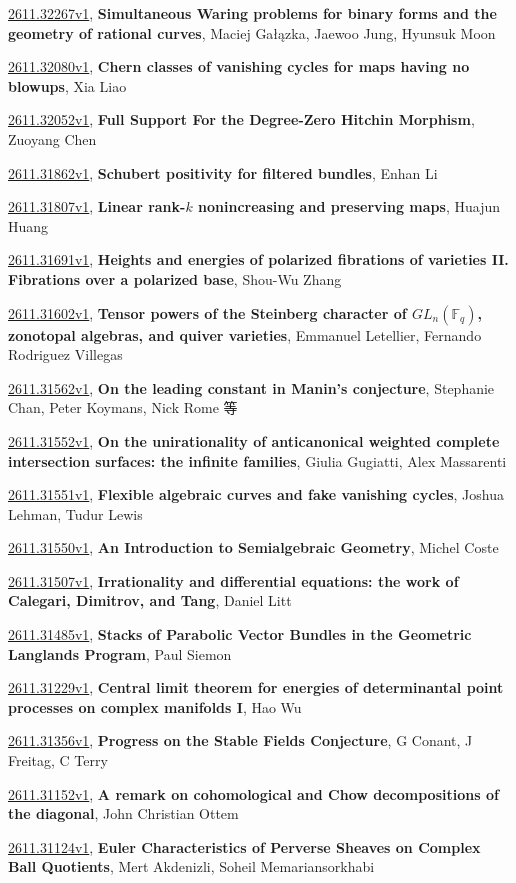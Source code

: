 \documentclass[9pt, a4paper]{article}
\theoremstyle{plain}
\theoremstyle{definition}
\theoremstyle{remark}
\newcommand{\arxiv}[3]{\href{https://arxiv.org/abs/#1}{#1}, \textbf{\textcolor{arxivblue}{#2}}, #3}
\begin{document}
\arxiv{2611.32267v1}{Simultaneous Waring problems for binary forms and the geometry of rational curves}{Maciej Gałązka, Jaewoo Jung, Hyunsuk Moon}

\arxiv{2611.32080v1}{Chern classes of vanishing cycles for maps having no blowups}{Xia Liao}

\arxiv{2611.32052v1}{Full Support For the Degree-Zero Hitchin Morphism}{Zuoyang Chen}

\arxiv{2611.31862v1}{Schubert positivity for filtered bundles}{Enhan Li}

\arxiv{2611.31807v1}{Linear rank-\(k\) nonincreasing and preserving maps}{Huajun Huang}

\arxiv{2611.31691v1}{Heights and energies of polarized fibrations of varieties II. Fibrations over a polarized base}{Shou-Wu Zhang}

\arxiv{2611.31602v1}{Tensor powers of the Steinberg character of $GL_n(\mathbb{F}_q)$, zonotopal algebras, and quiver varieties}{Emmanuel Letellier, Fernando Rodriguez Villegas}

\arxiv{2611.31562v1}{On the leading constant in Manin's conjecture}{Stephanie Chan, Peter Koymans, Nick Rome 等}

\arxiv{2611.31552v1}{On the unirationality of anticanonical weighted complete intersection surfaces: the infinite families}{Giulia Gugiatti, Alex Massarenti}

\arxiv{2611.31551v1}{Flexible algebraic curves and fake vanishing cycles}{Joshua Lehman, Tudur Lewis}

\arxiv{2611.31550v1}{An Introduction to Semialgebraic Geometry}{Michel Coste}

\arxiv{2611.31507v1}{Irrationality and differential equations: the work of Calegari, Dimitrov, and Tang}{Daniel Litt}

\arxiv{2611.31485v1}{Stacks of Parabolic Vector Bundles in the Geometric Langlands Program}{Paul Siemon}

\arxiv{2611.31229v1}{Central limit theorem for energies of determinantal point processes on complex manifolds I}{Hao Wu}

\arxiv{2611.31356v1}{Progress on the Stable Fields Conjecture}{G Conant, J Freitag, C Terry}

\arxiv{2611.31152v1}{A remark on cohomological and Chow decompositions of the diagonal}{John Christian Ottem}

\arxiv{2611.31124v1}{Euler Characteristics of Perverse Sheaves on Complex Ball Quotients}{Mert Akdenizli, Soheil Memariansorkhabi}
\end{document}
